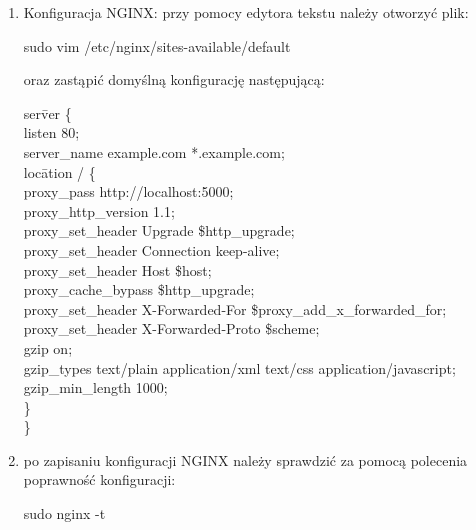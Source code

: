\documentclass[12pt,a4paper]{article}
\begin{document}
\begin{enumerate}
				\item Konfiguracja NGINX:
					przy pomocy edytora tekstu należy otworzyć plik:
					\begin{tcolorbox}[minipage,colback=white,arc=0pt,outer arc=0pt, fontupper=\footnotesize]
						sudo vim /etc/nginx/sites-available/default
					\end{tcolorbox}	
					oraz zastąpić domyślną konfigurację następującą:
					\begin{tcolorbox}[minipage,colback=white,arc=0pt,outer arc=0pt, fontupper=\footnotesize]
						\begin{tabbing}
							ser\= ver \{\\
								\> listen	80;\\
    							\> server\_name   example.com *.example.com;\\
    							\> loc\= ation / \{\\
        						\>\> proxy\_pass         http://localhost:5000;\\
        						\>\> proxy\_http\_version 1.1;\\
        						\>\> proxy\_set\_header   Upgrade \$http\_upgrade;\\
        						\>\> proxy\_set\_header   Connection keep-alive;\\
        						\>\> proxy\_set\_header   Host \$host;\\
        						\>\> proxy\_cache\_bypass \$http\_upgrade;\\
        						\>\> proxy\_set\_header   X-Forwarded-For \$proxy\_add\_x\_forwarded\_for;\\
        						\>\> proxy\_set\_header   X-Forwarded-Proto \$scheme;\\
        						\>\> gzip on;\\
        						\>\> gzip\_types text/plain application/xml text/css application/javascript;\\
        						\>\> gzip\_min\_length 1000;\\
		    					\> \}\\
							\}
						\end{tabbing}
					\end{tcolorbox}				
			
				\item po zapisaniu konfiguracji NGINX należy sprawdzić za pomocą polecenia poprawność konfiguracji:
					\begin{tcolorbox}[minipage,colback=white,arc=0pt,outer arc=0pt, fontupper=\footnotesize]
						sudo nginx -t
					\end{tcolorbox}
		

\end{enumerate}
\end{document}
